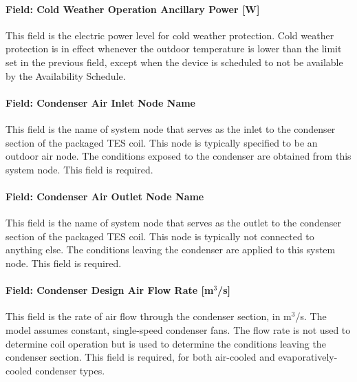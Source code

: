 \paragraph{Field: Cold Weather Operation Ancillary Power {[}W{]}}\label{field-cold-weather-operation-ancillary-power-w}

This field is the electric power level for cold weather protection. Cold weather protection is in effect whenever the outdoor temperature is lower than the limit set in the previous field, except when the device is scheduled to not be available by the Availability Schedule.

\paragraph{Field: Condenser Air Inlet Node Name}\label{field-condenser-air-inlet-node-name-5}

This field is the name of system node that serves as the inlet to the condenser section of the packaged TES coil. This node is typically specified to be an outdoor air node. The conditions exposed to the condenser are obtained from this system node. This field is required.

\paragraph{Field: Condenser Air Outlet Node Name}\label{field-condenser-air-outlet-node-name}

This field is the name of system node that serves as the outlet to the condenser section of the packaged TES coil. This node is typically not connected to anything else. The conditions leaving the condenser are applied to this system node. This field is required.

\paragraph{\texorpdfstring{Field: Condenser Design Air Flow Rate {[}m\(^{3}\)/s{]}}{Field: Condenser Design Air Flow Rate {[}m\^{}\{3\}/s{]}}}\label{field-condenser-design-air-flow-rate-m3s}

This field is the rate of air flow through the condenser section, in m\(^{3}\)/s. The model assumes constant, single-speed condenser fans. The flow rate is not used to determine coil operation but is used to determine the conditions leaving the condenser section. This field is required, for both air-cooled and evaporatively-cooled condenser types.

